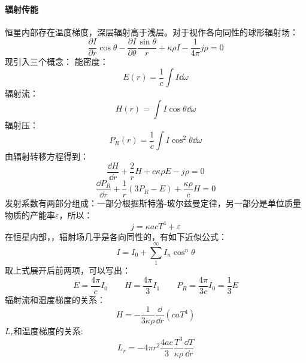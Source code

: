 \paragraph{辐射传能}恒星内部存在温度梯度，深层辐射高于浅层。对于视作各向同性的球形辐射场：
\begin{equation}
	\frac{\partial I}{\partial r}\cos \theta -\frac{\partial I}{\partial \theta}\frac{\sin \theta }{r}+\kappa\rho I-\frac{1}{4\pi}j\rho=0
\end{equation}
现引入三个概念：
\noindent 能密度：\begin{equation}
		E(r)=\frac{1}{c}\int I\dd \omega
	\end{equation}
辐射流：\begin{equation}
		H(r)=\int I\cos \theta \dd \omega
	\end{equation}
辐射压：\begin{equation}
		P_{R}(r)=\frac{1}{c}\int I\cos^2 \theta \dd \omega
	\end{equation}
由辐射转移方程得到：
\begin{equation}
	\frac{\dd H}{\dd r}+\frac{2}{r}H+c\kappa\rho E-j\rho=0
\end{equation}
\begin{equation}
	\frac{\dd P_{R}}{\dd r}+\frac{1}{r}(3P_{R}-E)+\frac{\kappa\rho}{c}H=0
\end{equation}
发射系数有两部分组成：一部分根据斯特藩-玻尔兹曼定律，另一部分是单位质量物质的产能率$\varepsilon$，所以：
\begin{equation}
	j=\kappa acT^4+\varepsilon
\end{equation}
在恒星内部，，辐射场几乎是各向同性的，有如下近似公式：
\begin{equation}
	I=I_{0}+\sum_{1}^{\infty}I_{n}\cos^n\theta
\end{equation}
取上式展开后前两项，可以写出：
\begin{equation}
	E=\frac{4\pi}{c}I_{0}\qquad H=\frac{4\pi}{3}I_{1}\qquad P_{R}=\frac{4\pi}{3c}I_{0}=\frac{1}{3}E
\end{equation}
辐射流和温度梯度的关系：
\begin{equation}
	H=-\frac{1}{3\kappa\rho}\frac{\dd }{\dd r}(caT^4)
\end{equation}
$L_{r}$和温度梯度的关系:
\begin{equation}
	L_{r}=-4\pi r^2\frac{4ac}{3}\frac{T^3}{\kappa\rho}\frac{\dd T}{\dd r}
\end{equation}
